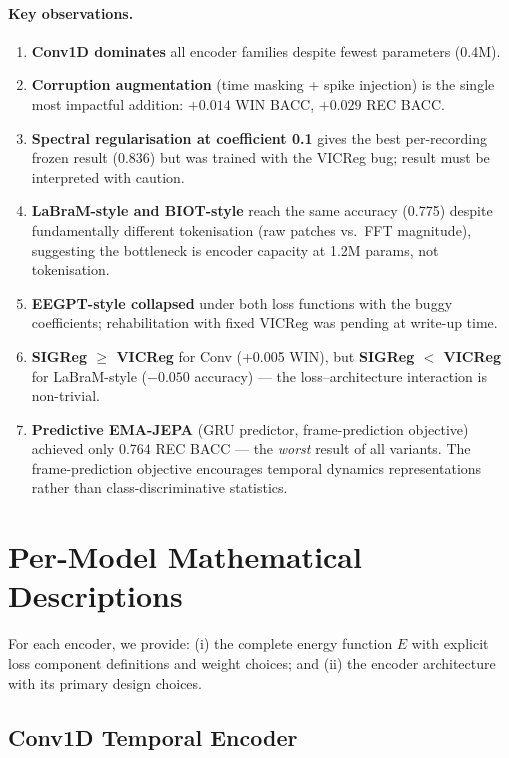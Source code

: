 \documentclass[11pt,a4paper]{article}
\begin{document}
\paragraph{Key observations.}
\begin{enumerate}[noitemsep]
  \item \textbf{Conv1D dominates} all encoder families despite fewest parameters (0.4M).
  \item \textbf{Corruption augmentation} (time masking + spike injection) is the
    single most impactful addition: $+0.014$ WIN BACC, $+0.029$ REC BACC.
  \item \textbf{Spectral regularisation at coefficient 0.1} gives the best
    per-recording frozen result (0.836) but was trained with the VICReg bug;
    result must be interpreted with caution.
  \item \textbf{LaBraM-style and BIOT-style} reach the same accuracy (0.775)
    despite fundamentally different tokenisation (raw patches vs.\ FFT magnitude),
    suggesting the bottleneck is encoder capacity at 1.2M params, not tokenisation.
  \item \textbf{EEGPT-style collapsed} under both loss functions with the buggy
    coefficients; rehabilitation with fixed VICReg was pending at write-up time.
  \item \textbf{SIGReg $\geq$ VICReg} for Conv (+0.005 WIN), but
    \textbf{SIGReg $<$ VICReg} for LaBraM-style ($-0.050$ accuracy) ---
    the loss--architecture interaction is non-trivial.
  \item \textbf{Predictive EMA-JEPA} (GRU predictor, frame-prediction objective)
    achieved only 0.764 REC BACC --- the \emph{worst} result of all variants.
    The frame-prediction objective encourages temporal dynamics representations
    rather than class-discriminative statistics.
\end{enumerate}

\section{Per-Model Mathematical Descriptions}
\label{sec:math}

For each encoder, we provide:
(i) the complete energy function $E$ with explicit loss component definitions
and weight choices; and
(ii) the encoder architecture with its primary design choices.

\subsection{Conv1D Temporal Encoder}
\label{sec:math_conv}
\end{document}
